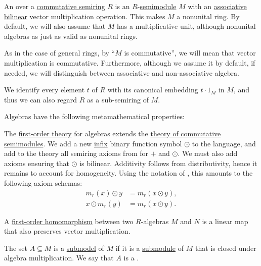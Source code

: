 \begin{definition}\label{def:algebra_over_semiring}\mimprovised
  An  over a \hyperref[def:semiring/commutative]{commutative semiring} \( R \) is an \( R \)-\hyperref[def:semimodule]{semimodule} \( M \) with an \hyperref[def:magma/associative]{associative} \hyperref[def:multilinear_function]{bilinear} vector multiplication operation. This makes \( M \) a nonunital ring. By default, we will also assume that \( M \) has a multiplicative unit, although nonunital algebras as just as valid as nonunital rings.

  As in the case of general rings, by \enquote{\( M \) is commutative}, we will mean that vector multiplication is commutative. Furthermore, although we assume it by default, if needed, we will distinguish between associative and non-associative algebra.

  We identify every element \( t \) of \( R \) with its canonical embedding \( t \cdot 1_M \) in \( M \), and thus we can also regard \( R \) as a sub-semiring of \( M \).

  Algebras have the following metamathematical properties:
  \begin{thmenum}
     The \hyperref[def:first_order_theory]{first-order theory} for algebras extends the \hyperref[def:semimodule/theory]{theory of commutative semimodules}. We add a new \hyperref[rem:first_order_formula_conventions/infix]{infix} binary function symbol \( \odot \) to the language, and add to the theory all semiring axioms from  for \( + \) and \( \odot \). We must also add axioms ensuring that \( \odot \) is bilinear. Additivity follows from distributivity, hence it remains to account for homogeneity. Using the notation of , this amounts to the following axiom schemas:
    \begin{align*}
      m_r(x) \odot y &= m_r(x \odot y), \\
      x \odot m_r(y) &= m_r(x \odot y).
    \end{align*}

     A \hyperref[def:first_order_homomorphism]{first-order homomorphism} between two \( R \)-algebras \( M \) and \( N \) is a linear map that also preserves vector multiplication.

     The set \( A \subseteq M \) is a \hyperref[thm:substructure_is_model]{submodel} of \( M \) if it is a \hyperref[def:monoid/submodel]{submodule} of \( M \) that is closed under algebra multiplication. We say that \( A \) is a .


\end{thmenum}
\end{definition}
